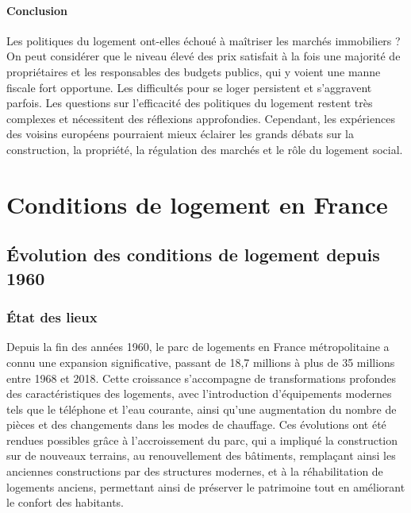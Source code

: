 \documentclass[a4paper, 12pt]{report}
\begin{document}
\subsubsection{Conclusion}

Les politiques du logement ont-elles échoué à maîtriser les marchés immobiliers ? On peut considérer que le niveau élevé des prix satisfait à la fois une majorité de propriétaires et les responsables des budgets publics, qui y voient une manne fiscale fort opportune. Les difficultés pour se loger persistent et s'aggravent parfois. Les questions sur l’efficacité des politiques du logement restent très complexes et nécessitent des réflexions approfondies. Cependant, les expériences des voisins européens pourraient mieux éclairer les grands débats sur la construction, la propriété, la régulation des marchés et le rôle du logement social.

\chapter{Conditions de logement en France}

\section{Évolution des conditions de logement depuis 1960}

\subsection{État des lieux}

Depuis la fin des années 1960, le parc de logements en France métropolitaine a connu une expansion significative, passant de 18,7 millions à plus de 35 millions entre 1968 et 2018. Cette croissance s'accompagne de transformations profondes des caractéristiques des logements, avec l'introduction d'équipements modernes tels que le téléphone et l'eau courante, ainsi qu'une augmentation du nombre de pièces et des changements dans les modes de chauffage. Ces évolutions ont été rendues possibles grâce à l'accroissement du parc, qui a impliqué la construction sur de nouveaux terrains, au renouvellement des bâtiments, remplaçant ainsi les anciennes constructions par des structures modernes, et à la réhabilitation de logements anciens, permettant ainsi de préserver le patrimoine tout en améliorant le confort des habitants.
\end{document}
